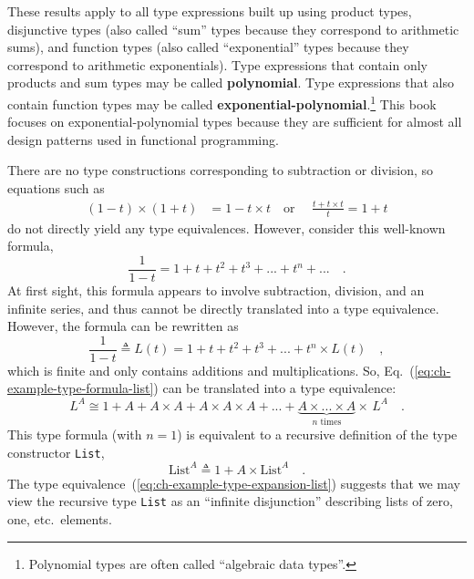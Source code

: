 These results apply to all type expressions built up using product
types, disjunctive types (also called \textsf{``}sum\textsf{''} types because they
correspond to arithmetic sums), and function types (also called \textsf{``}exponential\textsf{''}
types because they correspond to arithmetic exponentials). Type expressions
that contain only products and sum types may be called \textbf{polynomial}.
Type expressions that also contain function types may be called \textbf{exponential-polynomial}.\footnote{Polynomial types are often called \textsf{``}algebraic data types\textsf{''}.}
This book focuses on exponential-polynomial types because they are
sufficient for almost all design patterns used in functional programming.

There are no type constructions corresponding to subtraction or division,
so equations such as 
\begin{align*}
\left(1-t\right)\times\left(1+t\right) & =1-t\times t\quad\text{or }\quad\frac{t+t\times t}{t}=1+t
\end{align*}
do not directly yield any type equivalences. However, consider this
well-known formula,
\[
\frac{1}{1-t}=1+t+t^{2}+t^{3}+...+t^{n}+...\quad.
\]
At first sight, this formula appears to involve subtraction, division,
and an infinite series, and thus cannot be directly translated into
a type equivalence. However, the formula can be rewritten as
\begin{equation}
\frac{1}{1-t}\triangleq L(t)=1+t+t^{2}+t^{3}+...+t^{n}\times L(t)\quad,\label{eq:ch-example-type-formula-list}
\end{equation}
which is finite and only contains additions and multiplications. So,
Eq.~(\ref{eq:ch-example-type-formula-list}) can be translated into
a type equivalence:
\begin{equation}
L^{A}\cong1+A+A\times A+A\times A\times A+...+\underbrace{A\times...\times A}_{n\text{ times}}\times\,L^{A}\quad.\label{eq:ch-example-type-expansion-list}
\end{equation}
This type formula (with $n=1$) is equivalent to a recursive definition
of the type constructor \lstinline!List!,
\[
\text{List}^{A}\triangleq1+A\times\text{List}^{A}\quad.
\]
The type equivalence~(\ref{eq:ch-example-type-expansion-list}) suggests
that we may view the recursive type \lstinline!List! as an \textsf{``}infinite
disjunction\textsf{''} describing lists of zero, one, etc.~elements.

